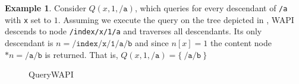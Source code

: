 \documentclass[abstracton,12pt]{scrartcl}
\theoremstyle{definition}
\newtheorem{example}{Example}
\begin{document}
\begin{example}
    Consider $Q(x, 1, \texttt{/a})$, which queries for every descendant of \texttt{/a} with \texttt{x} set to $1$.
    Assuming we execute the query on the tree depicted in , 
    WAPI descends to node \texttt{/index/x/1/a} and traverses all descendants.
    Its only descendant is $n = \texttt{/index/x/1/a/b}$ and since $n[x] = 1$ the content node $*n = \texttt{/a/b}$ is returned.
    That is, $Q(x, 1, \texttt{/a}) = \{~\texttt{/a/b}~\}$
\end{example}

\vspace{2.5cm}

\begin{figure}[h]
    \begin{multicols}{2}
        \begin{center}
            \begin{footnotesize}
            \end{footnotesize}
        \end{center}    
        \columnbreak
        \begin{algorithm}[H]
            \DontPrintSemicolon
            \begin{scriptsize}
                \label{algo:query_wapi}
                \caption{QueryWAPI}

\end{scriptsize}
\end{algorithm}
\end{multicols}
\end{figure}
\end{document}
